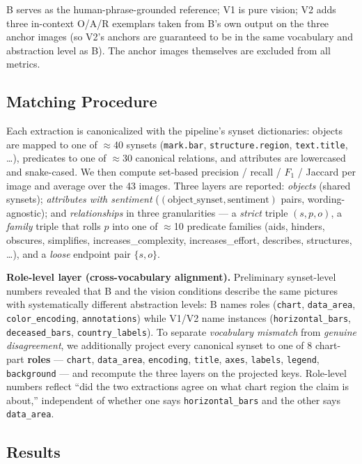 B serves as the human-phrase-grounded reference; V1 is pure vision;
V2 adds three in-context O/A/R exemplars taken from B's own output on
the three anchor images (so V2's anchors are guaranteed to be in the
same vocabulary and abstraction level as B). The anchor images
themselves are excluded from all metrics.

\subsection{Matching Procedure}
\label{app:oar-matching}

Each extraction is canonicalized with the pipeline's synset
dictionaries: objects are mapped to one of $\approx$40 synsets
(\texttt{mark.bar}, \texttt{structure.region}, \texttt{text.title},
\dots), predicates to one of $\approx$30 canonical relations, and
attributes are lowercased and snake-cased. We then compute set-based
precision / recall / $F_1$ / Jaccard per image and average over the
43 images. Three layers are reported: \emph{objects} (shared
synsets); \emph{attributes with sentiment} ($(\text{object\_synset},
\text{sentiment})$ pairs, wording-agnostic); and \emph{relationships}
in three granularities --- a \emph{strict} triple $(s, p, o)$, a
\emph{family} triple that rolls $p$ into one of $\approx$10 predicate
families (aids, hinders, obscures, simplifies,
increases\_complexity, increases\_effort, describes, structures,
\dots), and a \emph{loose} endpoint pair $\{s, o\}$.

\textbf{Role-level layer (cross-vocabulary alignment).} Preliminary
synset-level numbers revealed that B and the vision conditions
describe the same pictures with systematically different abstraction
levels: B names roles (\texttt{chart}, \texttt{data\_area},
\texttt{color\_encoding}, \texttt{annotations}) while V1/V2 name
instances (\texttt{horizontal\_bars}, \texttt{deceased\_bars},
\texttt{country\_labels}). To separate \emph{vocabulary mismatch}
from \emph{genuine disagreement}, we additionally project every
canonical synset to one of 8 chart-part \textbf{roles} ---
\texttt{chart}, \texttt{data\_area}, \texttt{encoding},
\texttt{title}, \texttt{axes}, \texttt{labels}, \texttt{legend},
\texttt{background} --- and recompute the three layers on the
projected keys. Role-level numbers reflect ``did the two extractions
agree on what chart region the claim is about,'' independent of
whether one says \texttt{horizontal\_bars} and the other says
\texttt{data\_area}.

\subsection{Results}
\label{app:oar-results}

